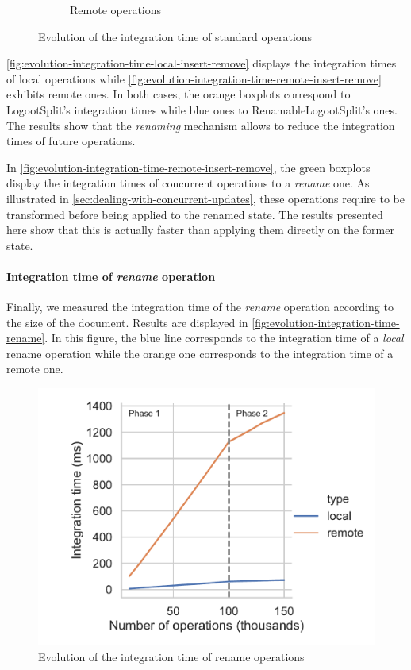 \documentclass[sigplan,10pt]{acmart}
\begin{document}
\begin{figure}
\begin{subfigure}{\columnwidth}
        \caption{Remote operations}
        \label{fig:evolution-integration-time-remote-insert-remove}
    \end{subfigure}
    \caption{Evolution of the integration time of standard operations}
    \label{fig:evolution-integration-time-insert-remove}
\end{figure}

\autoref{fig:evolution-integration-time-local-insert-remove} displays the integration times of local operations while \autoref{fig:evolution-integration-time-remote-insert-remove} exhibits remote ones.
In both cases, the orange boxplots correspond to LogootSplit's integration times while blue ones to RenamableLogootSplit's ones.
The results show that the \emph{renaming} mechanism allows to reduce the integration times of future operations.

In \autoref{fig:evolution-integration-time-remote-insert-remove}, the green boxplots display the integration times of concurrent operations to a \emph{rename} one.
As illustrated in \autoref{sec:dealing-with-concurrent-updates}, these operations require to be transformed before being applied to the renamed state.
The results presented here show that this is actually faster than applying them directly on the former state.

\paragraph{Integration time of \emph{rename} operation}

Finally, we measured the integration time of the \emph{rename} operation according to the size of the document.
Results are displayed in \autoref{fig:evolution-integration-time-rename}.
In this figure, the blue line corresponds to the integration time of a \emph{local} rename operation while the orange one corresponds to the integration time of a remote one.

\begin{figure}
    \centering
    \includegraphics[width=0.9\columnwidth]{img/integration-time-rename.pdf}
    \caption{Evolution of the integration time of rename operations}
    \label{fig:evolution-integration-time-rename}
\end{figure}
\end{document}
